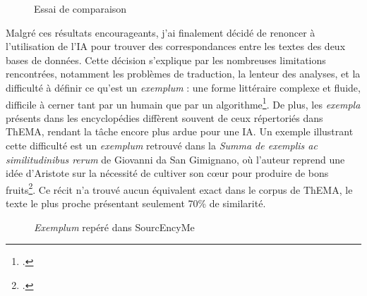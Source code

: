 \begin{figure}[H]
	\centering
	\caption{Essai de comparaison}
\end{figure}

Malgré ces résultats encourageants, j'ai finalement décidé de renoncer à l'utilisation de l'IA pour trouver des correspondances entre les textes des deux bases de données. Cette décision s'explique par les nombreuses limitations rencontrées, notamment les problèmes de traduction, la lenteur des analyses, et la difficulté à définir ce qu'est un \textit{exemplum} : une forme littéraire complexe et fluide, difficile à cerner tant par un humain que par un algorithme\footcite{berliozIntroductionGenerale2010}. De plus, les \textit{exempla} présents dans les encyclopédies diffèrent souvent de ceux répertoriés dans ThEMA, rendant la tâche encore plus ardue pour une IA. Un exemple illustrant cette difficulté est un \textit{exemplum} retrouvé dans la \textit{Summa de exemplis ac similitudinibus rerum} de Giovanni da San Gimignano, où l'auteur reprend une idée d'Aristote sur la nécessité de cultiver son cœur pour produire de bons fruits\footcite{RecitExemplaireUtilise}. Ce récit n'a trouvé aucun équivalent exact dans le corpus de ThEMA, le texte le plus proche présentant seulement 70\% de similarité. \\

\begin{figure}[H]
	\centering
	\caption{\textit{Exemplum} repéré dans SourcEncyMe}
\end{figure}

